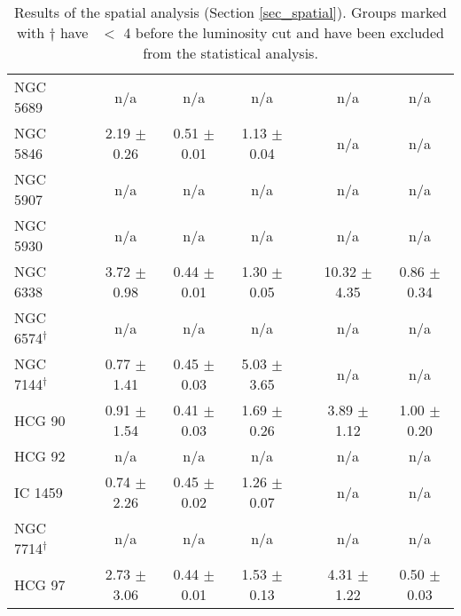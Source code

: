 \begin{table*}
\begin{center}
\begin{tabular}{@{}l@{}c@{\hspace{0.6cm}}ccc@{}c@{\hspace{0.6cm}}cc@{}}
NGC 5689              & &  n/a               &  n/a              &  n/a              & &  n/a               &  n/a              \\
NGC 5846              & &  2.19  $\pm$ 0.26  &  0.51 $\pm$ 0.01  &  1.13 $\pm$ 0.04  & &  n/a               &  n/a              \\
NGC 5907              & &  n/a               &  n/a              &  n/a              & &  n/a               &  n/a              \\
NGC 5930              & &  n/a               &  n/a              &  n/a              & &  n/a               &  n/a              \\
NGC 6338              & &  3.72  $\pm$ 0.98  &  0.44 $\pm$ 0.01  &  1.30 $\pm$ 0.05  & &  10.32 $\pm$ 4.35  &  0.86 $\pm$ 0.34  \\
NGC 6574$^{\dagger}$  & &  n/a               &  n/a              &  n/a              & &  n/a               &  n/a              \\
NGC 7144$^{\dagger}$  & &  0.77  $\pm$ 1.41  &  0.45 $\pm$ 0.03  &  5.03 $\pm$ 3.65  & &  n/a               &  n/a              \\
HCG 90                & &  0.91  $\pm$ 1.54  &  0.41 $\pm$ 0.03  &  1.69 $\pm$ 0.26  & &  3.89  $\pm$ 1.12  &  1.00 $\pm$ 0.20  \\
HCG 92                & &  n/a               &  n/a              &  n/a              & &  n/a               &  n/a              \\
IC  1459              & &  0.74  $\pm$ 2.26  &  0.45 $\pm$ 0.02  &  1.26 $\pm$ 0.07  & &  n/a               &  n/a              \\
NGC 7714$^{\dagger}$  & &  n/a               &  n/a              &  n/a              & &  n/a               &  n/a              \\
HCG 97                & &  2.73  $\pm$ 3.06  &  0.44 $\pm$ 0.01  &  1.53 $\pm$ 0.13  & &  4.31  $\pm$ 1.22  &  0.50 $\pm$ 0.03  \\


\hline
\end{tabular}
\end{center}


\caption
{\label{tab_spatial}
Results of the spatial analysis (Section \ref{sec_spatial}). Groups marked with
$\dagger$ have \Ngal\ $<$ 4 before the luminosity cut and have been excluded from
the statistical analysis.}


\end{table*}
